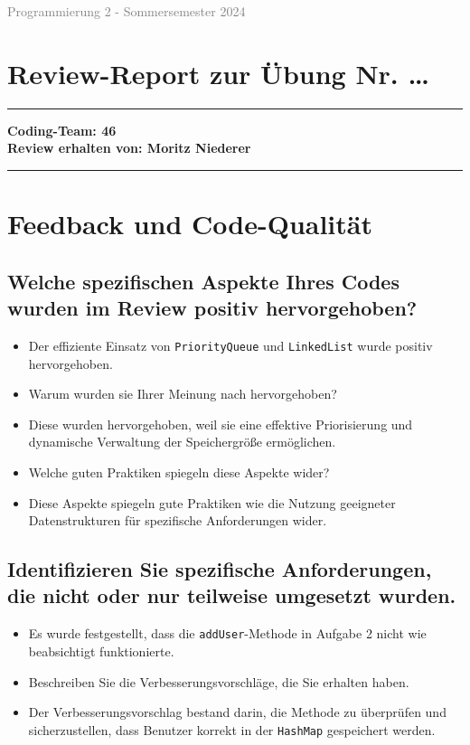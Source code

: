 \documentclass[a4paper,11pt]{article}
\newcommand{\smallgray}[1]{\textcolor{gray}{\small #1}}
\newcommand{\myrule}{\noindent\rule{\textwidth}{0.5pt}}
\begin{document}
\noindent\smallgray{Programmierung 2 - Sommersemester 2024}

\section*{\LARGE Review-Report zur Übung Nr. \dots}

\myrule

\vspace{0.5cm}

\noindent\textbf{Coding-Team: 46}\\
\textbf{Review erhalten von: Moritz Niederer}

\vspace{0.5cm}

\myrule

\vspace{1cm}

\section*{Feedback und Code-Qualität}

\subsection*{Welche spezifischen Aspekte Ihres Codes wurden im Review positiv hervorgehoben?}
\begin{itemize}
    \item Der effiziente Einsatz von \texttt{PriorityQueue} und \texttt{LinkedList} wurde positiv hervorgehoben.
    \item Warum wurden sie Ihrer Meinung nach hervorgehoben?
    \item Diese wurden hervorgehoben, weil sie eine effektive Priorisierung und dynamische Verwaltung der Speichergröße ermöglichen.
    \item Welche guten Praktiken spiegeln diese Aspekte wider?
    \item Diese Aspekte spiegeln gute Praktiken wie die Nutzung geeigneter Datenstrukturen für spezifische Anforderungen wider.
\end{itemize}

\subsection*{Identifizieren Sie spezifische Anforderungen, die nicht oder nur teilweise umgesetzt wurden.}
\begin{itemize}
    \item Es wurde festgestellt, dass die \texttt{addUser}-Methode in Aufgabe 2 nicht wie beabsichtigt funktionierte.
    \item Beschreiben Sie die Verbesserungsvorschläge, die Sie erhalten haben.
    \item Der Verbesserungsvorschlag bestand darin, die Methode zu überprüfen und sicherzustellen, dass Benutzer korrekt in der \texttt{HashMap} gespeichert werden.
\end{itemize}
\end{document}
